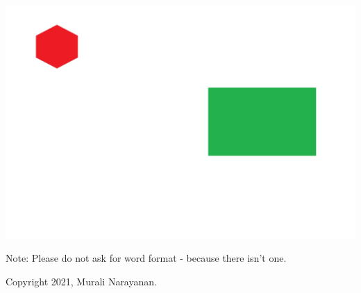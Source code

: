 \clearpage
 \pagestyle{empty}

\begin{minipage}[c][20cm][c]{\textwidth} 
	\includegraphics*[width=\textwidth,height=\textheight,keepaspectratio]
	{images/backdrop.jpg}
\end{minipage}

\vfill
Note: Please do not ask for word format - because there isn't one.

Copyright 2021, Murali Narayanan.  
